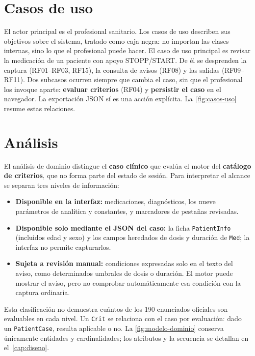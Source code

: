 \section{Casos de uso}
\label{sec:casos-uso}

El actor principal es el profesional sanitario. Los casos de uso describen
sus objetivos sobre el sistema, tratado como caja negra: no importan las
clases internas, sino lo que el profesional puede hacer. El caso de uso
principal es revisar la medicación de un paciente con apoyo STOPP/START.
De él se desprenden la captura (RF01--RF03, RF15), la consulta de avisos
(RF08) y las salidas (RF09--RF11). Dos subcasos ocurren siempre que cambia
el caso, sin que el profesional los invoque aparte: \textbf{evaluar
criterios} (RF04) y \textbf{persistir el caso} en el navegador. La
exportación JSON sí es una acción explícita. La~\cref{fig:casos-uso}
resume estas relaciones.



\section{Análisis}
\label{sec:analisis}

El análisis de dominio distingue el \textbf{caso clínico} que evalúa el
motor del \textbf{catálogo de criterios}, que no forma parte del estado de
sesión. Para interpretar el alcance se separan tres niveles de información:

\begin{itemize}
  \item \textbf{Disponible en la interfaz:} medicaciones, diagnósticos, los
    nueve parámetros de analítica y constantes, y marcadores de pestañas
    revisadas.
  \item \textbf{Disponible solo mediante el JSON del caso:} la ficha
    \texttt{PatientInfo} (incluidos edad y sexo) y los campos heredados de
    dosis y duración de \texttt{Med}; la interfaz no permite capturarlos.
  \item \textbf{Sujeta a revisión manual:} condiciones expresadas solo en
    el texto del aviso, como determinados umbrales de dosis o duración. El
    motor puede mostrar el aviso, pero no comprobar automáticamente esa
    condición con la captura ordinaria.
\end{itemize}

Esta clasificación no demuestra cuántos de los 190 enunciados oficiales
son evaluables en cada nivel. Un \texttt{Crit} se relaciona con el caso por
evaluación: dado un \texttt{PatientCase}, resulta aplicable o no. La
\cref{fig:modelo-dominio} conserva únicamente entidades y cardinalidades;
los atributos y la secuencia se detallan en el~\cref{cap:diseno}.

